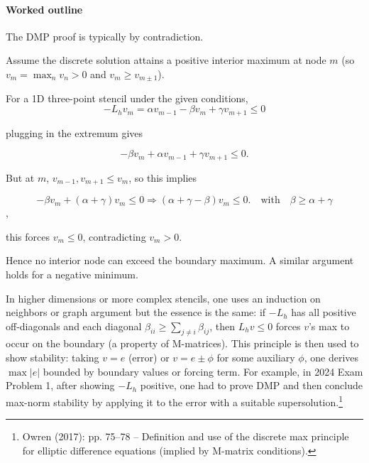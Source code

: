 \documentclass[a4paper,11pt]{article}
\begin{document}
\paragraph{Worked outline}
The DMP proof is typically by contradiction.

Assume the discrete solution attains a positive interior maximum at node $m$ (so $v_m = \max_n v_n > 0$ and $v_m \ge v_{m\pm1}$).

For a 1D three-point stencil under the given conditions,
$$
-L_h v_m = \alpha v_{m-1} - \beta v_m + \gamma v_{m+1} \le 0$$

plugging in the extremum gives

$$-\beta v_m + \alpha v_{m-1} + \gamma v_{m+1} \le 0.$$

But at $m$, $v_{m-1},v_{m+1}\le v_m$, so this implies

$$-\beta v_m + (\alpha+\gamma) v_m \le 0 \Rightarrow (\alpha+\gamma - \beta)v_m \le 0. \quad \text{with} \quad \beta \ge \alpha+\gamma$$,

this forces $v_m \le 0$, contradicting $v_m>0$.

Hence no interior node can exceed the boundary maximum.  A similar argument holds for a negative minimum.


In higher dimensions or more complex stencils, one uses an induction on neighbors or graph argument but the essence is the same: if $-L_h$ has all positive off-diagonals and each diagonal $\beta_{ii} \ge \sum_{j\neq i}\beta_{ij}$, then $L_h v \le 0$ forces $v$'s max to occur on the boundary (a property of M-matrices). This principle is then used to show stability: taking $v = e$ (error) or $v = e \pm \phi$ for some auxiliary $\phi$, one derives $\max |e|$ bounded by boundary values or forcing term. For example, in 2024 Exam Problem 1, after showing $-L_h$ positive, one had to prove DMP and then conclude max-norm stability by applying it to the error with a suitable supersolution.\footnote{Owren (2017): pp. 75--78 -- Definition and use of the discrete max principle for elliptic difference equations (implied by M-matrix conditions).}
\end{document}
